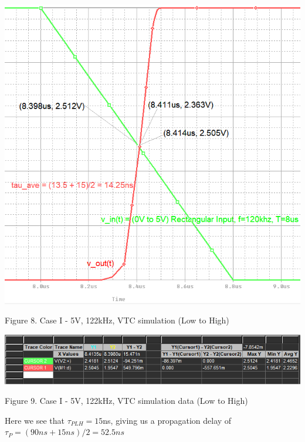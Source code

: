 \documentclass[conference]{IEEEtran}
\begin{document}
\begin{center}
    \centerline{\includegraphics[scale = 0.45]{figures/case1_results_LH.png}}
    Figure 8. Case I - 5V, 122kHz, VTC simulation (Low to High)
\end{center} 

\begin{center}
    \centerline{\includegraphics[scale = 0.45]{figures/case1_results_LH_data.png}}
    Figure 9. Case I - 5V, 122kHz, VTC simulation data (Low to High)
\end{center} 

Here we see that $\tau_{PLH} = 15$ns, giving us a propagation delay of 
$\tau_P = (90ns + 15ns)/2 = 52.5ns$
\end{document}
